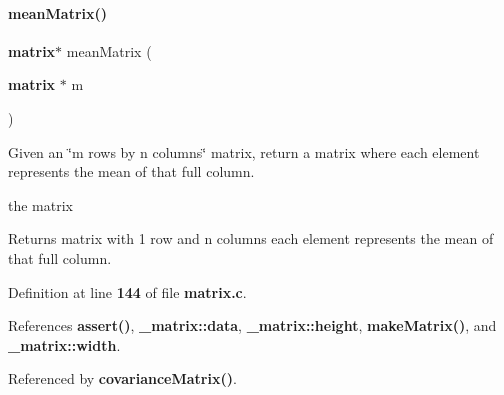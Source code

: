 \mbox{\label{matrix_8c_ae4babf9b518a2d5d6b12776191e3b7de}} 
\paragraph{mean\+Matrix()}
{\footnotesize\ttfamily \textbf{ matrix}$\ast$ mean\+Matrix (\begin{DoxyParamCaption}\item[{\textbf{ matrix} $\ast$}]{m }\end{DoxyParamCaption})}



Given an \char`\"{}m rows by n columns\char`\"{} matrix, return a matrix where each element represents the mean of that full column. 

the matrix \begin{DoxyReturn}{Returns}
matrix with 1 row and n columns each element represents the mean of that full column. 
\end{DoxyReturn}


Definition at line \textbf{ 144} of file \textbf{ matrix.\+c}.



References \textbf{ assert()}, \textbf{ \+\_\+matrix\+::data}, \textbf{ \+\_\+matrix\+::height}, \textbf{ make\+Matrix()}, and \textbf{ \+\_\+matrix\+::width}.



Referenced by \textbf{ covariance\+Matrix()}.


